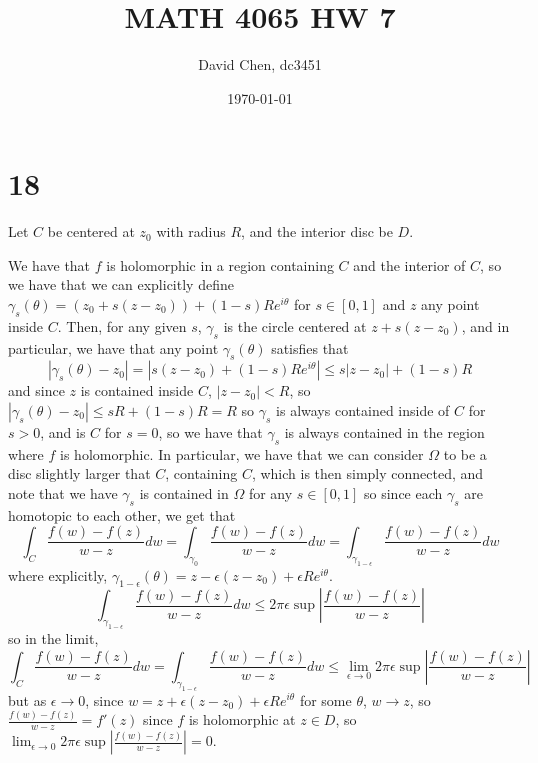 \documentclass[12pt,letterpaper]{article}
\title{MATH 4065 HW 7}
\author{David Chen, dc3451}
\date{\today}
\theoremstyle{definition}
\begin{document}
\maketitle

\section*{18}

Let $C$ be centered at $z_{0}$ with radius $R$, and the interior disc be $D$.

We have that $f$ is holomorphic in a region containing $C$ and the interior of $C$, so we have that we can explicitly define $\gamma_{s}(\theta) = (z_{0} + s (z - z_{0})) + (1-s)Re^{i\theta}$ for $s \in [0,1]$ and $z$ any point inside $C$. Then, for any given $s$, $\gamma_{s}$ is the circle centered at $z + s(z - z_{0})$, and in particular, we have that any point $\gamma_{s}(\theta)$ satisfies that
\[
  |\gamma_{s}(\theta) - z_{0}| = |s(z - z_{0}) + (1-s)Re^{i\theta}| \leq s|z - z_{0}| + (1-s)R
\]
and since $z$ is contained inside $C$, $|z - z_{0}| < R$, so $|\gamma_{s}(\theta) - z_{0}| \leq sR + (1-s)R = R$ so $\gamma_{s}$ is always contained inside of $C$ for $s > 0$, and is $C$ for $s = 0$, so we have that $\gamma_{s}$ is always contained in the region where $f$ is holomorphic. In particular, we have that we can consider $\Omega$ to be a disc slightly larger that $C$, containing $C$, which is then simply connected, and note that we have $\gamma_{s}$ is contained in $\Omega$ for any $s \in [0,1]$ so since each $\gamma_{s}$ are homotopic to each other, we get that
\[
  \int_{C}\frac{f(w) - f(z)}{w-z}dw = \int_{\gamma_{0}}\frac{f(w) - f(z)}{w-z}dw = \int_{\gamma_{1-\epsilon}}\frac{f(w)-f(z)}{w-z}dw
\]
where explicitly, $\gamma_{1-\epsilon}(\theta) = z - \epsilon(z - z_{0}) + \epsilon Re^{i\theta}$.
\[
  \int_{\gamma_{1-\epsilon}}\frac{f(w)-f(z)}{w-z}dw \leq 2\pi \epsilon \sup \left|\frac{f(w)-f(z)}{w-z}\right|
\]
so in the limit,
\[
  \int_{C}\frac{f(w)-f(z)}{w-z}dw = \int_{\gamma_{1-\epsilon}}\frac{f(w)-f(z)}{w-z}dw \leq \lim_{\epsilon \rightarrow 0}2\pi \epsilon \sup\left|\frac{f(w)-f(z)}{w-z}\right|
\]
but as $\epsilon \rightarrow 0$, since $w = z + \epsilon(z - z_{0}) + \epsilon Re^{i\theta}$ for some $\theta$, $w \rightarrow z$, so $\frac{f(w)-f(z)}{w-z} = f'(z)$ since $f$ is holomorphic at $z \in D$, so $\lim_{\epsilon \rightarrow 0}2\pi \epsilon \sup \left|\frac{f(w)-f(z)}{w-z}\right| = 0$.
\end{document}

